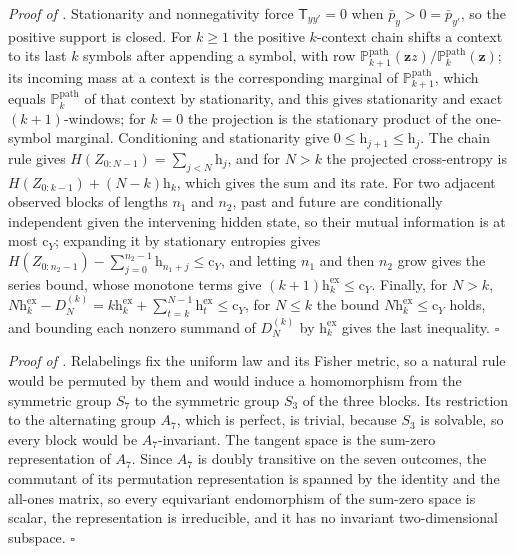 \noindent\emph{Proof of .}
Stationarity and nonnegativity force $\mathsf T_{yy'}=0$ when $\bar p_y>0=\bar
p_{y'}$, so the positive support is closed. For $k\ge1$ the positive $k$-context
chain shifts a context to its last $k$ symbols after appending a symbol, with row
$\mathbb P^{\mathrm{path}}_{k+1}(\mathbf zz)/\mathbb P^{\mathrm{path}}_k(\mathbf z)$; its incoming mass at a context
is the corresponding marginal of $\mathbb P^{\mathrm{path}}_{k+1}$, which equals $\mathbb P^{\mathrm{path}}_k$ of that
context by stationarity, and this gives stationarity and exact $(k+1)$-windows; for
$k=0$ the projection is the stationary product of the one-symbol marginal.
Conditioning and stationarity give $0\le\mathrm h_{j+1}\le\mathrm h_j$. The chain
rule gives $H(Z_{0:N-1})=\sum_{j<N}\mathrm h_j$, and for $N>k$ the projected
cross-entropy is $H(Z_{0:k-1})+(N-k)\mathrm h_k$, which gives the sum and its rate.
For two adjacent observed blocks of lengths $n_1$ and $n_2$, past and future are
conditionally independent given the intervening hidden state, so their mutual
information is at most $\mathrm c_Y$; expanding it by stationary entropies gives
$H(Z_{0:n_2-1})-\sum_{j=0}^{n_2-1}\mathrm h_{n_1+j}\le\mathrm c_Y$, and letting $n_1$
and then $n_2$ grow gives the series bound, whose monotone terms give
$(k+1)\mathrm h^{\mathrm{ex}}_k\le\mathrm c_Y$. Finally, for $N>k$,
$N\mathrm h^{\mathrm{ex}}_k-D^{(k)}_N=k\mathrm h^{\mathrm{ex}}_k
+\sum_{t=k}^{N-1}\mathrm h^{\mathrm{ex}}_t\le\mathrm c_Y$, for $N\le k$ the bound
$N\mathrm h^{\mathrm{ex}}_k\le\mathrm c_Y$ holds, and bounding each nonzero summand of
$D^{(k)}_N$ by $\mathrm h^{\mathrm{ex}}_k$ gives the last inequality. $\square$

\noindent\emph{Proof of .}
Relabelings fix the uniform law and its Fisher metric, so a natural rule would be
permuted by them and would induce a homomorphism from the symmetric group $S_7$ to
the symmetric group $S_3$ of the three blocks. Its restriction to the alternating
group $A_7$, which is perfect, is trivial, because $S_3$ is solvable, so every block
would be $A_7$-invariant. The tangent space is the sum-zero representation of
$A_7$. Since $A_7$ is doubly transitive on the seven outcomes, the commutant of its
permutation representation is spanned by the identity and the all-ones matrix, so
every equivariant endomorphism of the sum-zero space is scalar, the representation
is irreducible, and it has no invariant two-dimensional subspace. $\square$
